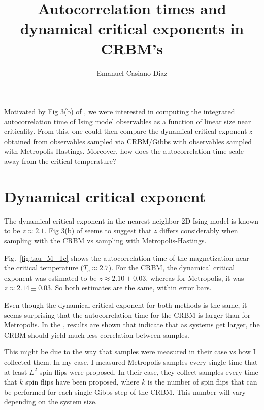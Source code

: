 \documentclass[12pt]{article}
\newcommand{\Figref}[1]{Fig.~\ref{#1}}
\begin{document}

\title{Autocorrelation times and dynamical critical exponents in CRBM's}%
\author{Emanuel Casiano-Diaz}
\maketitle

Motivated by Fig 3(b) of \cite{Alcalde_Puente_2020}, we were interested in computing the integrated autocorrelation time of Ising model observables as a function of linear size near criticality. From this, one could then compare the dynamical critical exponent $z$ obtained from observables sampled via CRBM/Gibbs with observables sampled with Metropolis-Hastings. Moreover, how does the autocorrelation time scale away from the critical temperature?

\section*{Dynamical critical exponent}

The dynamical critical exponent in the nearest-neighbor 2D Ising model is known to be $z \approx 2.1$. Fig 3(b) of \cite{Alcalde_Puente_2020} seems to suggest that $z$ differs considerably when sampling with the CRBM vs sampling with Metropolis-Hastings.

\Figref{fig:tau_M_Tc} shows the autocorrelation time of the magnetization near the critical temperature ($T_c\approx2.7$). For the CRBM, the dynamical critical exponent was estimated to be $z \approx 2.10 \pm 0.03$, whereas for Metropolis, it was $z \approx 2.14 \pm 0.03$. So both estimates are the same, within error bars. 

Even though the dynamical critical exponent for both methods is the same, it seems surprising that the autocorrelation time for the CRBM is larger than for Metropolis. In the \cite{Alcalde_Puente_2020}, results are shown that indicate that as systems get larger, the CRBM should yield much less correlation between samples.

This might be due to the way that samples were measured in their case vs how I collected them. In my case, I measured Metropolis samples every single time that at least $L^2$ spin flips were proposed. In their case, they collect samples every time that $k$ spin flips have been proposed, where $k$ is the number of spin flips that can be performed for each single Gibbs step of the CRBM. This number will vary depending on the system size.
\end{document}
